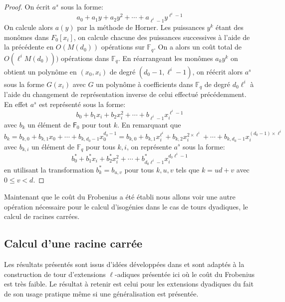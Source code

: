 \documentclass[10pt,a4paper]{book}
\theoremstyle{plain}
\theoremstyle{definition}
\theoremstyle{definition}
\theoremstyle{definition}
\theoremstyle{definition}
\theoremstyle{remark}
\theoremstyle{remark}
\begin{document}
\begin{proof}
On écrit $a^s$ sous la forme:
\begin{equation*}
a_0 + a_1 y + a_2 y^2 + \cdots + a_{\ell^i-1}y^{\ell^i-1}
\end{equation*}
On calcule alors $a(y)$ par la méthode de Horner. Les puissances $y^k$ étant des monômes dans $F_0[x_i]$, on calcule chacune des puissances successives à l'aide de la précédente en $O(M(d_0))$ opérations sur $\mathbb{F}_q$. On a alors un coût total de $O(\ell^{i}M(d_0)))$ opérations dans $\mathbb{F}_q$. En réarrangeant les monômes $a_k y^k$ on obtient un polynôme en $(x_0,x_i)$ de degré $(d_0-1,\ell^i-1)$, on réécrit alors $a^s$ sous la forme $G(x_i)$ avec $G$ un polynôme à coefficients dans $\mathbb{F}_q$ de degré $d_0\ell^i$  à l'aide du changement de représentation inverse de celui effectué précédemment. En effet $a^s$ est représenté sous la forme:
\begin{equation*}
b_0 + b_1 x_i + b_2 x_i^2 + \cdots + b_{\ell^i-1}x_i^{\ell^i-1}
\end{equation*}
avec $b_k$ un élément de $\mathsf{F}_0$ pour tout $k$. En remarquant que
\begin{equation*}
 b_k=b_{k,0} + b_{k,1}x_0 + \cdots + b_{k,d_0-1} x_0^{d_0-1}=b_{k,0} + b_{k,1}x_i^{\ell^i} + b_{k,2} x_i^{2 \times \ell^i} + \cdots + b_{k,d_0-1} x_i^{(d_0-1)\times \ell^i} 
\end{equation*}
 avec $b_{k,i}$ un élément de $\mathbb{F}_q$ pour tous $k,i$, on représente $a^s$ sous la forme:
\begin{equation*}
b_0^* + b_1^* x_i + b^*_2 x_i^2 + \cdots + b^*_{d_0\ell^i-1} x_i^{d_0\ell^i-1}
\end{equation*}
 en  utilisant la transformation $b_k^*=b_{u,v}$ pour tous $k,u,v$ tels que $k=ud+v$ avec $0 \leqslant v < d$.
\end{proof}

Maintenant que le coût du Frobenius a été établi nous allons voir une autre opération nécessaire pour le calcul d'isogénies dans le cas de tours dyadiques, le calcul de racines carrées.

\subsection*{Calcul d'une racine carrée}
Les résultats présentés sont issus d'idées développées dans \cite{Doliskani-Schost14} et sont adaptés à la construction de tour d'extensions $\ell$-adiques présentée ici où le coût du Frobenius est très faible. Le résultat à retenir est celui pour les extensions dyadiques du fait de son usage pratique même si une généralisation est présentée. 
\end{document}
